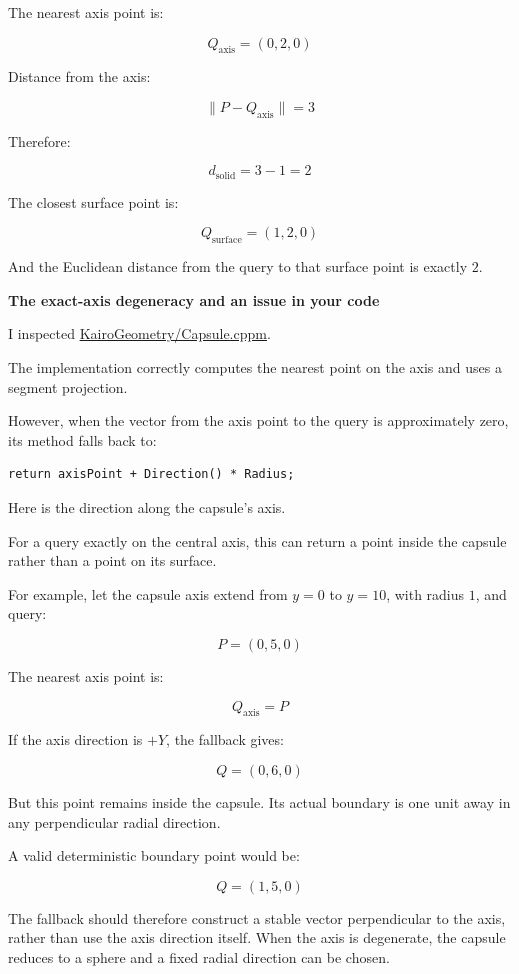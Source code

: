 The nearest axis point is:

\[
Q_{\mathrm{axis}}=(0,2,0)
\]

Distance from the axis:

\[
\|P-Q_{\mathrm{axis}}\|=3
\]

Therefore:

\[
d_{\mathrm{solid}}=3-1=2
\]

The closest surface point is:

\[
\boxed{Q_{\mathrm{surface}}=(1,2,0)}
\]

And the Euclidean distance from the query to that surface point is exactly \(2\).

\textbf{The exact-axis degeneracy and an issue in your code}

I inspected \href{https://github.com/swayam8624/KairoGeometry/blob/master/Capsule.cppm?utm_source=chatgpt.com}{KairoGeometry/Capsule.cppm}.

The implementation correctly computes the nearest point on the axis and uses a segment projection.

However, when the vector from the axis point to the query is approximately zero, its  method falls back to:

\begin{verbatim}
return axisPoint + Direction() * Radius;
\end{verbatim}

Here  is the direction along the capsule's axis.

For a query exactly on the central axis, this can return a point inside the capsule rather than a point on its surface.

For example, let the capsule axis extend from \(y=0\) to \(y=10\), with radius \(1\), and query:

\[
P=(0,5,0)
\]

The nearest axis point is:

\[
Q_{\mathrm{axis}}=P
\]

If the axis direction is \(+Y\), the fallback gives:

\[
Q=(0,6,0)
\]

But this point remains inside the capsule. Its actual boundary is one unit away in any perpendicular radial direction.

A valid deterministic boundary point would be:

\[
Q=(1,5,0)
\]

The fallback should therefore construct a stable vector perpendicular to the axis, rather than use the axis direction itself. When the axis is degenerate, the capsule reduces to a sphere and a fixed radial direction can be chosen.

